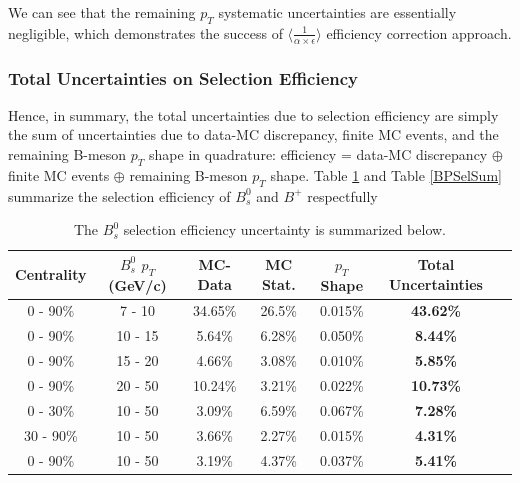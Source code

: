 We can see that the remaining $p_T$ systematic uncertainties are essentially negligible, which demonstrates the success of $\langle\frac{1}{\alpha \times \epsilon}\rangle$ efficiency correction approach. 

\subsubsection{Total Uncertainties on Selection Efficiency}

Hence, in summary, the total uncertainties due to selection efficiency are simply the sum of uncertainties due to data-MC discrepancy, finite MC events, and the remaining B-meson $p_T$ shape in quadrature: efficiency = data-MC discrepancy $\oplus$ finite MC events $\oplus$ remaining B-meson $p_T$ shape. Table \ref{BsSelSum} and Table \ref{BPSelSum} summarize the selection efficiency of $B^0_s$ and $B^+$ respectfully 


\begin{table}[h]
\begin{center}
\caption{The $B^0_s$ selection efficiency uncertainty is summarized below.}
\vspace{1em}
\label{BsSelSum}
  \begin{tabular}{| c | c |c | c| c| c| c| }
    \hline
     Centrality & $B^0_s$ $p_T$ (GeV/c) & MC-Data  & MC Stat. & $p_T$ Shape & Total Uncertainties \\
    \hline
    \hline
0 - 90\% & 7 - 10 &   34.65\%  &  26.5\% & 0.015\% &  \textbf{43.62\%} \\ 
0 - 90\% & 10 - 15 & 5.64\%  & 6.28\%  & 0.050\% &   \textbf{8.44\%}  \\ 
0 - 90\% & 15 - 20 &  4.66\%   & 3.08\%   &  0.010\% &  \textbf{5.85\%} \\ 
0 - 90\% & 20 - 50 &  10.24\%   & 3.21\%  &  0.022\%  &   \textbf{10.73\%}\\ 
0 - 30\% & 10 - 50  & 3.09\%  & 6.59\%  & 0.067\% &  \textbf{7.28\%} \\ 
30 - 90\% & 10 - 50 &  3.66\% &   2.27\%  & 0.015\% &  \textbf{4.31\%} \\ 
0 - 90\% & 10 - 50 & 3.19\%   & 4.37\%  & 0.037\% &   \textbf{5.41\%} \\ 
    \hline
    \hline
\end{tabular}
\end{center}
\end{table}



